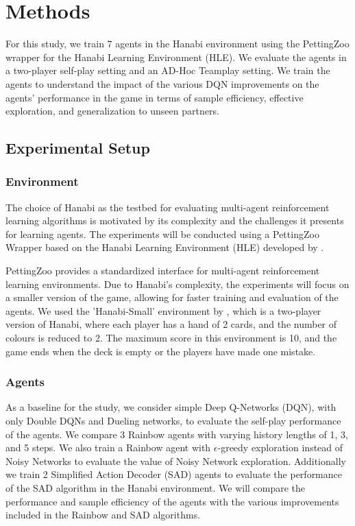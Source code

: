\section{Methods}
For this study, we train 7 agents in the Hanabi environment using the PettingZoo wrapper for the Hanabi Learning Environment (HLE). We evaluate the agents in a two-player self-play setting and an AD-Hoc Teamplay setting. We train the agents to understand the impact of the various DQN improvements on the agents' performance in the game in terms of sample efficiency, effective exploration, and generalization to unseen partners.
\subsection*{Experimental Setup}
\subsubsection*{Environment}
The choice of Hanabi as the testbed for evaluating multi-agent reinforcement learning algorithms is motivated by its complexity and the challenges it presents for learning agents. The experiments will be conducted using a PettingZoo\cite{PettingZooDocumentation} Wrapper based on the Hanabi Learning Environment (HLE)\cite{GoogledeepmindHanabilearningenvironment2024} developed by \textcite{bardHanabiChallengeNew2020a}.

PettingZoo provides a standardized interface for multi-agent reinforcement learning environments. Due to Hanabi's complexity, the experiments will focus on a smaller version of the game, allowing for faster training and evaluation of the agents. We used the 'Hanabi-Small' environment by \textcite{bardHanabiChallengeNew2020a}, which is a two-player version of Hanabi, where each player has a hand of 2 cards, and the number of colours is reduced to 2. The maximum score in this environment is 10, and the game ends when the deck is empty or the players have made one mistake.

\subsubsection*{Agents}
As a baseline for the study, we consider simple Deep Q-Networks (DQN), with only Double DQNs and Dueling networks, to evaluate the self-play performance of the agents. We compare 3 Rainbow agents with varying history lengths of 1, 3, and 5 steps. We also train a Rainbow agent with $\epsilon$-greedy exploration instead of Noisy Networks to evaluate the value of Noisy Network exploration. Additionally we train 2 Simplified Action Decoder (SAD) agents to evaluate the performance of the SAD algorithm in the Hanabi environment. We will compare the performance and sample efficiency of the agents with the various improvements included in the Rainbow and SAD algorithms.

